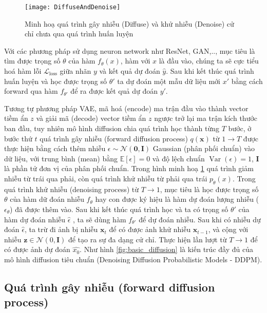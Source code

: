 \setcounter{figure}{4}
\begin{figure}[H]
	\centering
	\texttt{[image: DiffuseAndDenoise]}
	\caption{Minh hoạ quá trình gây nhiễu (Diffuse) và khử nhiễu (Denoise) cử chỉ chưa qua quá trình huấn luyện}
	\label{fig:DiffuseAndDenoise}
\end{figure}

Với các phương pháp sử dụng neuron network như ResNet, GAN,.., mục tiêu là tìm được trọng số $\theta$ của hàm $f_{\theta}(x)$, hàm với $x$ là đầu vào, chúng ta sẽ cực tiểu hoá hàm lỗi $\mathcal{L}_\text{loss}$ giữa nhãn $y$ và kết quả dự đoán $\hat{y}$. Sau khi kết thúc quá trình huấn luyện và học được trọng số $\theta'$ ta dự đoán một mẫu dữ liệu mới $x'$ bằng cách forward qua hàm $f_{\theta'}$ để ra được kết quả dự đoán $y'$.



Tương tự phương pháp VAE, mã hoá (encode) ma trận đầu vào thành vector tiềm ẩn $z$ và giải mã (decode) vector tiềm ẩn $z$ ngược trở lại ma trận kích thước ban đầu, tuy nhiên mô hình diffusion chia quá trình học thành từng $T$ bước, ở bước thứ $t$ quá trình gây nhiễu (forward diffusion process) $q(\mathbf{x})$ từ $1 \to T$ được thực hiện bằng cách thêm nhiễu $\epsilon \sim \mathcal{N} (\mathbf{0}, \mathbf{I})$ Gaussian (phân phối chuẩn) vào dữ liệu, với trung bình  (mean) bằng $\mathbb{E}[\epsilon]=0$ và độ lệch chuẩn $\operatorname{Var}(\epsilon)=1$, $\mathbf{I}$ là phần tử đơn vị của phân phối chuẩn. Trong hình minh hoạ \ref{fig:DiffuseAndDenoise} quá trình giảm nhiễu từ trái qua phải, còn quá trình khử nhiễu từ phải qua trái $p_\theta(x)$. Trong quá trình khử nhiễu (denoising process) từ $T \to 1$, mục tiêu là học được trọng số $\theta$ của hàm dữ đoán nhiễu $f_{\theta}$ hay con được ký hiệu là hàm dự đoán lượng nhiễu ($\epsilon_\theta$) đã được thêm vào. Sau khi kết thúc quá trình học và ta có trọng số $\theta'$ của hàm dự đoán nhiễu $\hat{\epsilon}$ , ta sẽ dùng hàm $f_{\theta'}$ để dự đoán nhiễu. Sau khi có nhiễu dự đoán $\hat{\epsilon}$, ta trừ đi ảnh bị nhiễu $\mathbf{x}_{t}$ để có được ảnh khử nhiễu $\mathbf{x}_{t-1}$, và cộng với nhiễu $ \mathbf{z} \in \mathcal{N}(0, \mathbf{I})$ để tạo ra sự đa dạng cử chỉ. Thực hiện lần lượt từ $T \to 1$ để có được ảnh dự đoán $\hat{x_0}$. Như hình \ref{fig:basic_diffusion} là kiến trúc đầy đủ của mô hình diffusion tiêu chuẩn (Denoising Diffusion Probabilistic Models - DDPM).

\subsection{Quá trình gây nhiễu (forward diffusion process)}

